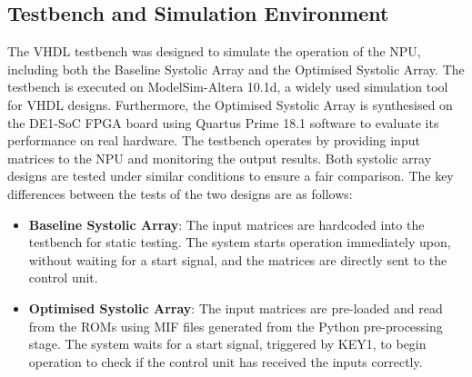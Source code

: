 \documentclass[12pt, a4paper, ukenglish]{article}
\begin{document}
    \subsection{Testbench and Simulation Environment} \label{sec: testbench}
    The VHDL testbench was designed to simulate the operation of the NPU, including both the Baseline Systolic Array and the Optimised Systolic Array. The testbench is executed on ModelSim-Altera 10.1d, a widely used simulation tool for VHDL designs. Furthermore, the Optimised Systolic Array is synthesised on the DE1-SoC FPGA board using Quartus Prime 18.1 software to evaluate its performance on real hardware. The testbench operates by providing input matrices to the NPU and monitoring the output results. Both systolic array designs are tested under similar conditions to ensure a fair comparison. The key differences between the tests of the two designs are as follows:
    \begin{itemize}
        \item \textbf{Baseline Systolic Array}: The input matrices are hardcoded into the testbench for static testing. The system starts operation immediately upon, without waiting for a start signal, and the matrices are directly sent to the control unit.

        \item \textbf{Optimised Systolic Array}: The input matrices are pre-loaded and read from the ROMs using MIF files generated from the Python pre-processing stage. The system waits for a start signal, triggered by KEY1, to begin operation to check if the control unit has received the inputs correctly. 
    \end{itemize}
\end{document}
